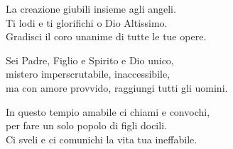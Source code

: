
\strofa La creazione giubili insieme agli angeli.\\
Ti lodi e ti glorifichi o Dio Altissimo.\\
Gradisci il coro unanime di tutte le tue opere.

\spazio


\spazio

\strofa Sei Padre, Figlio e Spirito e Dio unico,\\
mistero imperscrutabile, inaccessibile,\\
ma con amore provvido, raggiungi tutti gli uomini.

\spazio


\spazio

\strofa In questo tempio amabile ci chiami e convochi,\\
per fare un solo popolo di figli docili.\\
Ci sveli e ci comunichi la vita tua ineffabile.

\spazio

